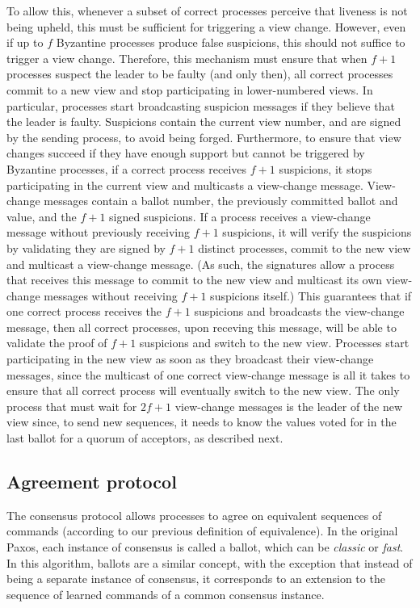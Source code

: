 To allow this, whenever a subset of correct processes perceive that liveness is not being upheld, this must be sufficient for triggering a view change. However, even if up to $f$ Byzantine processes produce false suspicions, this should not suffice to trigger a view change. Therefore, this mechanism must ensure that when $f+1$ processes suspect the leader to be faulty (and only then), all correct processes commit to a new view and stop participating in lower-numbered views. In particular, processes start broadcasting suspicion messages if they believe that the leader is faulty. Suspicions contain the current view number, and are signed by the sending process, to avoid being forged. Furthermore, to ensure that view changes succeed if they have enough support but cannot be triggered by Byzantine processes, if a correct process receives $f+1$ suspicions, it stops participating in the current view and multicasts a view-change message. View-change messages contain a ballot number, the previously committed ballot and value, and the $f+1$ signed suspicions. If a process receives a view-change message without previously receiving $f+1$ suspicions, it will verify the suspicions by validating they are signed by $f+1$ distinct processes, commit to the new view and multicast a view-change message. (As such, the signatures allow a process that receives this message to commit to the new view and multicast its own view-change messages without receiving $f+1$ suspicions itself.)  This guarantees that if one correct process receives the $f+1$ suspicions and broadcasts the view-change message, then all correct processes, upon receving this message, will be able to validate the proof of $f+1$ suspicions and switch to the new view. Processes start participating in the new view as soon as they broadcast their view-change messages, since the multicast of one correct view-change message is all it takes to ensure that all correct process will eventually switch to the new view. The only process that must wait for $2f+1$ view-change messages is the leader of the new view since, to send new sequences, it needs to know the values voted for in the last ballot for a quorum of acceptors, as described next.


\subsection{Agreement protocol} 

The consensus protocol allows processes to agree on equivalent sequences of commands (according to our previous definition of equivalence). 
In the original Paxos, each instance of consensus is called a ballot, which can be \textit{classic} or \textit{fast}. 
In this algorithm, ballots are a similar concept, with the exception that instead of being a separate instance of consensus, 
it corresponds to an extension to the sequence of learned commands of a common consensus instance.

